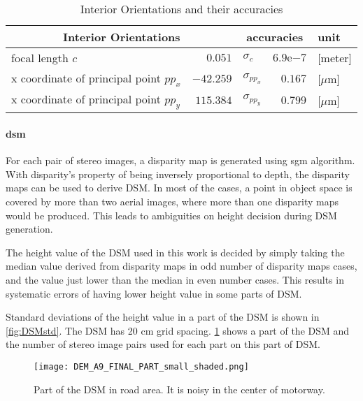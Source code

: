 \begin{table}%
    \centering
    \begin{tabular}{lr|lr|l}
    \toprule
    \multicolumn{2}{c|}{Interior Orientations}  & \multicolumn{2}{c|}{accuracies} & unit\\
    \midrule
    focal length $c$                       &   $0.051$ & $\sigma_c$      & $6.9\mathrm{e}{-7}$ & [meter]\\
    x coordinate of principal point $pp_x$ & $-42.259$ & $\sigma_{pp_x}$ & $0.167$             &[$\mu$m]\\
    x coordinate of principal point $pp_y$ & $115.384$ & $\sigma_{pp_y}$ & $0.799$             &[$\mu$m]\\
    \bottomrule
    \end{tabular}
    \caption{Interior Orientations and their accuracies}
    \label{tab:IOaccuracy}
\end{table}

\clearpage
\paragraph{\gls{dsm}}
For each pair of stereo images, a disparity map is generated using \gls{sgm} algorithm. With disparity's property of being inversely proportional to depth, the disparity maps can be used to derive DSM. In most of the cases, a point in object space is covered by more than two aerial images, where more than one disparity maps would be produced. This leads to ambiguities on height decision during DSM generation.

The height value of the DSM used in this work is decided by simply taking the median value derived from disparity maps in odd number of disparity maps cases, and the value just lower than the median in even number cases. This results in systematic errors of having lower height value in some parts of DSM.

Standard deviations of the height value in a part of the DSM is shown in \cref{fig:DSMstd}. The DSM has 20 cm grid spacing. \cref{fig:DSM} shows a part of the DSM and the number of stereo image pairs used for each part on this part of DSM.

\begin{figure}%
  \centering
  \texttt{[image: DEM\_A9\_FINAL\_PART\_small\_shaded.png]}
  \caption{Part of the DSM in road area. It is noisy in the center of motorway.}
  \label{fig:DSM}
\end{figure}

